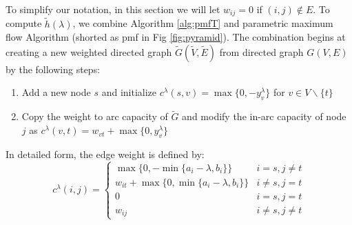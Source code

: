 \documentclass{article}
\begin{document}
To simplify our notation, in this section we will let $w_{ij} = 0$ if $(i,j) \not\in E$. To compute $\tilde{h}(\lambda)$, we combine Algorithm \ref{alg:pmfT} and parametric maximum flow Algorithm (shorted as pmf in Fig \ref{fig:pyramid}). The combination begins at creating a new weighted directed graph $\widetilde{G}(\widetilde{V}, \widetilde{E})$ from directed graph $G(V,E)$ by the following steps:
\begin{enumerate}
	\item Add a new node $s$ and initialize $c^{\lambda}(s,v)=\max\{0, -y^{\lambda}_v\}$ for $v \in V\backslash \{t\}$
	\item Copy the weight to arc capacity of $\widetilde{G}$ and modify the in-arc capacity of node $j$ as $c^{\lambda}(v,t) = w_{vt} + \max\{0, y^{\lambda}_v\}$
	\end{enumerate}
In detailed form, the edge weight is defined by:
\begin{equation}
c^{\lambda}(i, j) = 
\begin{cases}
	\max\{0, -\min\{a_i-\lambda, b_i\}\} &  i = s, j \neq t \\
	w_{it} + \max\{0, \min\{a_i - \lambda, b_i\}\} & i\neq s, j = t\\
	0 & i = s, j = t\\
	w_{ij} & i \neq s, j \neq t
\end{cases}
\end{equation}
\end{document}
